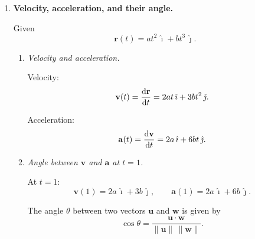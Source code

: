 \documentclass[12pt]{article}
\begin{document}
\begin{enumerate}
\begin{enumerate}
    Units: $\mathbf{F}$ is volume flux per area per time, $\mathbf{A}$ is area, so the product is volume per time.

    \item \textit{Effect of orientation.}

    In general,
    \[
      Q = \mathbf{F} \cdot \mathbf{A}
      = |\mathbf{F}|\,|\mathbf{A}|\cos\theta,
    \]
    where $\theta$ is the angle between $\mathbf{F}$ and the surface normal.
    If you tilt the surface, its area vector $\mathbf{A}$ tilts. The effective flux is reduced by $\cos\theta$.
    \begin{itemize}
        \item If the surface is perpendicular to the flow (normal aligned with $\mathbf{F}$), $\theta=0$, $\cos\theta=1$, and $Q$ is maximal.
        \item If the surface is parallel to the flow (normal perpendicular to $\mathbf{F}$), $\theta=90^\circ$, $\cos\theta=0$, and $Q=0$.
    \end{itemize}
    Here the surface normal is $\hat{k}$, so only the $k$-component of $\mathbf{F}$ contributes to the flux.
\end{enumerate}


\item \textbf{Velocity, acceleration, and their angle.}

Given
\[
  \mathbf{r}(t) = a t^2 \,\hat{\imath} + b t^3 \,\hat{\jmath}.
\]

\begin{enumerate}
    \item \textit{Velocity and acceleration.}

    Velocity:
    \[
      \mathbf{v}(t) = \dv{\mathbf{r}}{t}
      = 2at \,\hat{\imath} + 3 b t^2 \,\hat{\jmath}.
    \]

    Acceleration:
    \[
      \mathbf{a}(t) = \dv{\mathbf{v}}{t}
      = 2a \,\hat{\imath} + 6 b t \,\hat{\jmath}.
    \]

    \item \textit{Angle between $\mathbf{v}$ and $\mathbf{a}$ at $t=1$.}

    At $t=1$:
    \[
      \mathbf{v}(1) = 2a\,\hat{\imath} + 3b\,\hat{\jmath}, \qquad
      \mathbf{a}(1) = 2a\,\hat{\imath} + 6b\,\hat{\jmath}.
    \]

    The angle $\theta$ between two vectors $\mathbf{u}$ and $\mathbf{w}$ is given by
    \[
      \cos\theta = \frac{\mathbf{u}\cdot\mathbf{w}}{\|\mathbf{u}\|\,\|\mathbf{w}\|}.
    \]


\end{enumerate}
\end{enumerate}
\end{document}
